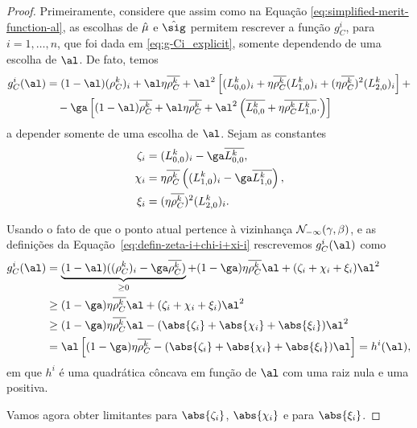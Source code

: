 \begin{proof}
 Primeiramente, considere que  assim como na Equação \eqref{eq:simplified-merit-function-al}, as escolhas de $\hat{\mu}$ e $\nextsig$ permitem rescrever a função $g_C^i $, para $i=1,\ldots,n$, que foi dada em \eqref{eq:g-Ci_explicit}, somente dependendo de uma escolha de $\al$. De fato, temos
\[
\begin{aligned}
{g}_C^i (\al)				& = (1-\al)(\rho_C^k )_i+ \al\eta\rhoCkb + \al^2\left[(L_{0,0}^{k})_i + \eta\rhoCkb  ({L_{1,0}^{k}})_i 
				+ (\eta\rhoCkb )^2(L_{2,0}^{k})_i \right]  + \\
				& \quad -\ga\left[  (1-\al)\rhoCkb  + \al\eta\rhoCkb  + \al^2\left(\dbvec{L_{0,0}^{k}} + \eta\rhoCkb  \dbvec{L_{1,0}^{k}}.
\right)  \right]
\end{aligned}
\]
a depender somente de uma escolha de $\al$.
Sejam as constantes
\begin{equation}
\label{eq:defin-zeta-i+chi-i+xi-i}
	\begin{aligned}
\zeta_i & = (L_{0,0}^{k})_i - \ga \dbvec{L_{0,0}^{k}}, \\
\chi_i  & = \eta\rhoCkb  \left( ({L_{1,0}^{k}})_i - \ga\dbvec{L_{1,0}^{k}} \right),   \\
\xi_i	& =  (\eta\rhoCkb )^2(L_{2,0}^{k})_i . \\ 	
\end{aligned}
\end{equation}



Usando o fato de que o ponto atual pertence à vizinhança $\mathcal{N}_{-\infty}(\gamma,\beta)$, e as definições da Equação~\eqref{eq:defin-zeta-i+chi-i+xi-i} rescrevemos  $g_C^i(\al) $ como
\[
\begin{aligned}
	g_C^i (\al) & = \underbrace{(1-\al)((\rho_C^k )_i - \ga\rhoCkb )}_{\geq 0}  + (1-\ga)\eta\rhoCkb  \al+  (\zeta_i + 				\chi_i + \xi_i)\al^2  \\
				& \geq (1-\ga)\eta\rhoCkb  \al +  (\zeta_i + 				\chi_i + \xi_i)\al^2 \\ 
				& \geq (1-\ga)\eta\rhoCkb  \al -  (\abs{\zeta_i} + \abs{\chi_i} + \abs{\xi_i})\al^2 \\
				& = \al \left[	(1-\ga)\eta\rhoCkb   -  (\abs{\zeta_i} + \abs{\chi_i} + \abs{\xi_i})\al	\right] = h^i(\al),
\end{aligned}
\]
em que $h^i$ é uma quadrática côncava em função de $\al$ com uma raiz nula e uma positiva. 


Vamos agora obter limitantes para $\abs{\zeta_i}$, $ \abs{\chi_i}$ e para  $\abs{\xi_i}$.


\end{proof}
